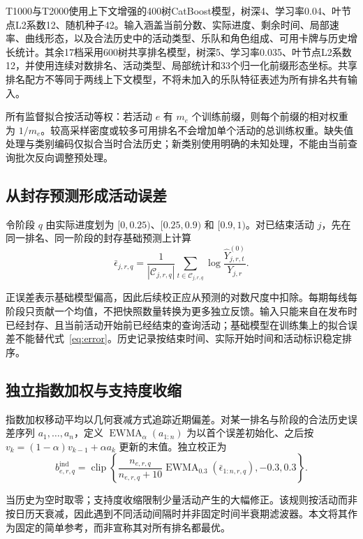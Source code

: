 \documentclass[a4paper,11pt,fontset=none]{ctexart}
\begin{document}
T1000与T2000使用上下文增强的400树CatBoost模型，树深4、学习率0.04、叶节点L2系数12、随机种子42。输入涵盖当前分数、实际进度、剩余时间、局部速率、曲线形态，以及合法历史中的活动类型、乐队和角色组成、可用卡牌与历史增长统计。其余17档采用600树共享排名模型，树深5、学习率0.035、叶节点L2系数12，并使用连续对数排名、活动类型、局部统计和33个归一化前缀形态坐标。共享排名配方不等同于两线上下文模型，不将未加入的乐队特征表述为所有排名共有输入。

所有监督拟合按活动等权：若活动 \(e\) 有 \(m_e\) 个训练前缀，则每个前缀的相对权重为 \(1/m_e\)。较高采样密度或较多可用排名不会增加单个活动的总训练权重。缺失值处理与类别编码仅拟合当时合法历史；新类别使用明确的未知处理，不能由当前查询批次反向调整预处理。

\subsection{从封存预测形成活动误差}

令阶段 \(q\) 由实际进度划为 \([0,0.25)\)、\([0.25,0.9)\) 和 \([0.9,1)\)。对已结束活动 \(j\)，先在同一排名、同一阶段的封存基础预测上计算
\begin{equation}\label{eq:error}
\bar\epsilon_{j,r,q}=\frac{1}{|\mathcal C_{j,r,q}|}\sum_{t\in\mathcal C_{j,r,q}}
\log\frac{\widehat Y^{(0)}_{j,r,t}}{Y_{j,r}}.
\end{equation}

正误差表示基础模型偏高，因此后续校正应从预测的对数尺度中扣除。每期每线每阶段只贡献一个均值，不把快照数量转换为更多独立反馈。输入只能来自在发布时已经封存、且当前活动开始前已经结束的查询活动；基础模型在训练集上的拟合误差不能替代式~\eqref{eq:error}。历史记录按结束时间、实际开始时间和活动标识稳定排序。

\subsection{独立指数加权与支持度收缩}

指数加权移动平均以几何衰减方式追踪近期偏差\citep{roberts1959ewma}。对某一排名与阶段的合法历史误差序列 \(a_1,\ldots,a_n\)，定义 \(\operatorname{EWMA}_{\alpha}(a_{1:n})\) 为以首个误差初始化、之后按 \(v_k=(1-\alpha)v_{k-1}+\alpha a_k\) 更新的末值。独立校正为
\begin{equation}\label{eq:independent}
b^{\mathrm{ind}}_{e,r,q}=\operatorname{clip}\!\left\{
\frac{n_{e,r,q}}{n_{e,r,q}+10}
\operatorname{EWMA}_{0.3}(\bar\epsilon_{1:n,r,q}),-0.3,0.3\right\}.
\end{equation}

当历史为空时取零；支持度收缩限制少量活动产生的大幅修正。该规则按活动而非按日历天衰减，因此遇到不同活动间隔时并非固定时间半衰期滤波器。本文将其作为固定的简单参考，而非宣称其对所有排名都最优。
\end{document}
